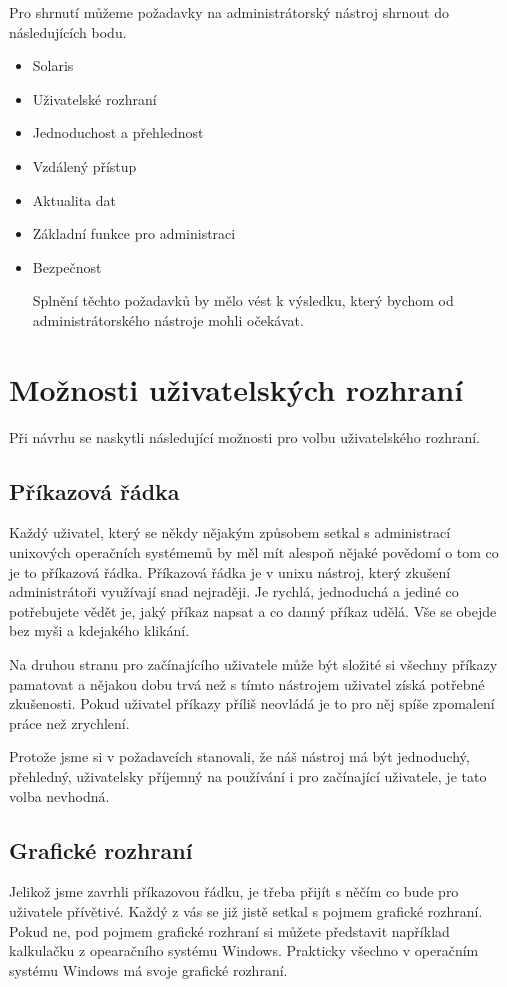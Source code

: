 Pro shrnutí můžeme požadavky na administrátorský nástroj shrnout do následujících bodu.
\begin{itemize}
    \item Solaris
    \item Uživatelské rozhraní
    \item Jednoduchost a přehlednost
    \item Vzdálený přístup
    \item Aktualita dat
    \item Základní funkce pro administraci
    \item Bezpečnost

Splnění těchto požadavků by mělo vést k výsledku, který bychom od administrátorského nástroje mohli očekávat.
\end{itemize}
\section{Možnosti uživatelských rozhraní}
Při návrhu se naskytli následující možnosti pro volbu uživatelského rozhraní.
    \subsection{Příkazová řádka}
    Každý uživatel, který se někdy nějakým způsobem setkal s administrací unixových operačních systémemů by měl mít alespoň nějaké povědomí o tom co je to příkazová řádka. Příkazová řádka je v unixu nástroj, který zkušení administrátoři využívají snad nejraději. Je rychlá, jednoduchá a jediné co potřebujete vědět je, jaký příkaz napsat a co danný příkaz udělá. Vše se obejde bez myši a kdejakého klikání.

    Na druhou stranu pro začínajícího uživatele může být složité si všechny příkazy pamatovat a nějakou dobu trvá než s tímto nástrojem uživatel získá potřebné zkušenosti. Pokud uživatel příkazy příliš neovládá je to pro něj spíše zpomalení práce než zrychlení.

    Protože jsme si v požadavcích stanovali, že náš nástroj má být jednoduchý, přehledný, uživatelsky příjemný na používání i pro začínající uživatele, je tato volba nevhodná.
    \subsection{Grafické rozhraní}
    Jelikož jsme zavrhli příkazovou řádku, je třeba přijít s něčím co bude pro uživatele přívětivé. Každý z vás se již jistě setkal s pojmem grafické rozhraní. Pokud ne, pod pojmem grafické rozhraní si můžete představit například kalkulačku z opearačního systému Windows. Prakticky všechno v operačním systému Windows má svoje grafické rozhraní.


